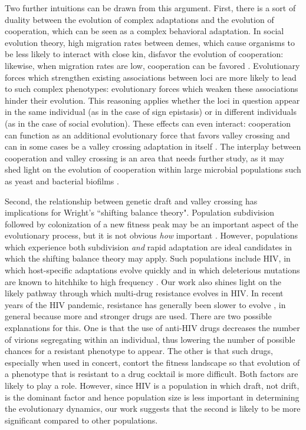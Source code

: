 \documentclass[rmp]{revtex4}
\begin{document}
\begin{spacing}{1.5}
Two further intuitions can be drawn from this argument.
First, there is a sort of duality between the evolution of complex adaptations and the evolution of cooperation, which can be seen as a complex behavioral adaptation.
In social evolution theory, high migration rates between demes, which cause organisms to be less likely to interact with close kin, disfavor the evolution of cooperation: likewise, when migration rates are low, cooperation can be favored \citep{van_cleve_2015}.
Evolutionary forces which strengthen existing associations between loci are more likely to lead to such complex phenotypes: evolutionary forces which weaken these associations hinder their evolution.
This reasoning applies whether the loci in question appear in the same individual (as in the case of sign epistasis) or in different individuals (as in the case of social evolution).
These effects can even interact: cooperation can function as an additional evolutionary force that favors valley crossing \citep{Obolski:Lewin-Epstein:2017} and can in some cases be a valley crossing adaptation in itself \citep{van_cleve_2013}.
The interplay between cooperation and valley crossing is an area that needs further study, as it may shed light on the evolution of cooperation within large microbial populations such as yeast \citep{gore_2009, gore_2013} and bacterial biofilms \citep{rainey_2003, van_gestel_2014}.

Second, the relationship between genetic draft and valley crossing has implications for Wright's ``shifting balance theory".
Population subdivision followed by colonization of a new fitness peak may be an important aspect of the evolutionary process, but it is not obvious \emph{how} important \citep{coyne_barton_turelli_2000}.
However, populations which experience both subdivision \emph{and} rapid adaptation are ideal candidates in which the shifting balance theory may apply.
Such populations include HIV, in which host-specific adaptations evolve quickly \citep{zhang_1997, wain_2007, dapp_2017, theys_2018} and in which deleterious mutations are known to hitchhike to high frequency \citep{zanini_2013, zanini_2015}.
Our work also shines light on the likely pathway through which multi-drug resistance evolves in HIV.
In recent years of the HIV pandemic, resistance has generally been slower to evolve \citep{feder_2015}, in general because more and stronger drugs are used.
There are two possible explanations for this.
One is that the use of anti-HIV drugs decreases the number of virions segregating within an individual, thus lowering the number of possible chances for a resistant phenotype to appear.
The other is that such drugs, especially when used in concert, contort the fitness landscape so that evolution of a phenotype that is resistant to a drug cocktail is more difficult.
Both factors are likely to play a role.
However, since HIV is a population in which draft, not drift, is the dominant factor and hence population size is less important in determining the evolutionary dynamics, our work suggests that the second is likely to be more significant compared to other populations.




\end{spacing}
\end{document}
